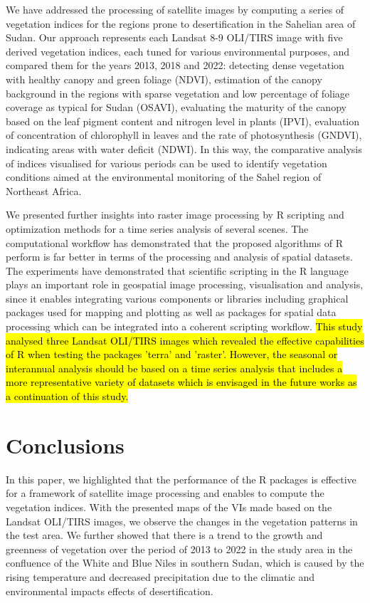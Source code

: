 \documentclass[jimaging,article,submit,pdftex,moreauthors]{Definitions/mdpi}
\begin{document}
We have addressed the processing of satellite images by computing a series of vegetation indices for the regions prone to desertification in the Sahelian area of Sudan. Our approach represents each Landsat 8-9 OLI/TIRS image with five derived vegetation indices, each tuned for various environmental purposes, and compared them for the years 2013, 2018 and 2022: detecting dense vegetation with healthy canopy and green foliage (NDVI), estimation of the canopy background in the regions with sparse vegetation and low percentage of foliage coverage as typical for Sudan (OSAVI), evaluating the maturity of the canopy based on the leaf pigment content and nitrogen level in plants (IPVI), evaluation of concentration of chlorophyll in leaves and the rate of photosynthesis (GNDVI), indicating areas with water deficit (NDWI). In this way, the comparative analysis of indices visualised for various periods can be used to identify vegetation conditions aimed at the environmental monitoring of the Sahel region of Northeast Africa.

We presented further insights into raster image processing by R scripting and optimization methods for a time series analysis of several scenes. The computational workflow has demonstrated that the proposed algorithms of R perform is far better in terms of the processing and analysis of spatial datasets. The experiments have demonstrated that scientific scripting in the R language plays an important role in geospatial image processing, visualisation and analysis, since it enables integrating various components or libraries including graphical packages used for mapping and plotting as well as packages for spatial data processing which can be integrated into a coherent scripting workflow. \hl{This study analysed three Landsat OLI/TIRS images which revealed the effective capabilities of R when testing the packages 'terra' and 'raster'. However, the seasonal or interannual analysis should be based on a time series analysis that includes a more representative variety of datasets which is envisaged in the future works as a continuation of this study.}

\section{Conclusions}

In this paper, we highlighted that the performance of the R packages is effective for a framework of satellite image processing and enables to compute the vegetation indices. With the presented maps of the VIs made based on the Landsat OLI/TIRS images, we observe the changes in the vegetation patterns in the test area. We further showed that there is a trend to the growth and greenness of vegetation over the period of 2013 to 2022 in the study area in the confluence of the White and Blue Niles in southern Sudan, which is caused by the rising temperature and decreased precipitation due to the climatic and environmental impacts effects of desertification.
\end{document}
